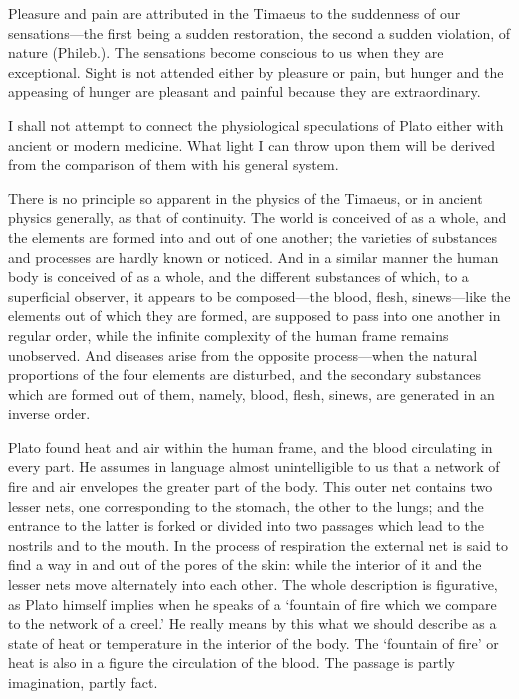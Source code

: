 Pleasure and pain are attributed in the Timaeus to the suddenness of our
sensations—the first being a sudden restoration, the second a sudden
violation, of nature (Phileb.). The sensations become conscious to us when
they are exceptional. Sight is not attended either by pleasure or pain,
but hunger and the appeasing of hunger are pleasant and painful because
they are extraordinary.


I shall not attempt to connect the physiological speculations of Plato
either with ancient or modern medicine. What light I can throw upon them
will be derived from the comparison of them with his general system.

There is no principle so apparent in the physics of the Timaeus, or in
ancient physics generally, as that of continuity. The world is conceived
of as a whole, and the elements are formed into and out of one another;
the varieties of substances and processes are hardly known or noticed. And
in a similar manner the human body is conceived of as a whole, and the
different substances of which, to a superficial observer, it appears to be
composed—the blood, flesh, sinews—like the elements out of
which they are formed, are supposed to pass into one another in regular
order, while the infinite complexity of the human frame remains
unobserved. And diseases arise from the opposite process—when the
natural proportions of the four elements are disturbed, and the secondary
substances which are formed out of them, namely, blood, flesh, sinews, are
generated in an inverse order.

Plato found heat and air within the human frame, and the blood circulating
in every part. He assumes in language almost unintelligible to us that a
network of fire and air envelopes the greater part of the body. This outer
net contains two lesser nets, one corresponding to the stomach, the other
to the lungs; and the entrance to the latter is forked or divided into two
passages which lead to the nostrils and to the mouth. In the process of
respiration the external net is said to find a way in and out of the pores
of the skin: while the interior of it and the lesser nets move alternately
into each other. The whole description is figurative, as Plato himself
implies when he speaks of a ‘fountain of fire which we compare to the
network of a creel.’ He really means by this what we should describe as a
state of heat or temperature in the interior of the body. The ‘fountain of
fire’ or heat is also in a figure the circulation of the blood. The
passage is partly imagination, partly fact.

